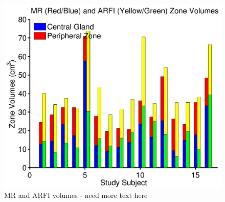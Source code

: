 \begin{figure}[htb!]
\centering
\includegraphics[width=0.5\linewidth]{figs/mr_arfi_volumes.pdf}
\caption{MR and ARFI volumes - need more text here}
\label{fig:mr_arfi_volumes} 
\end{figure}
